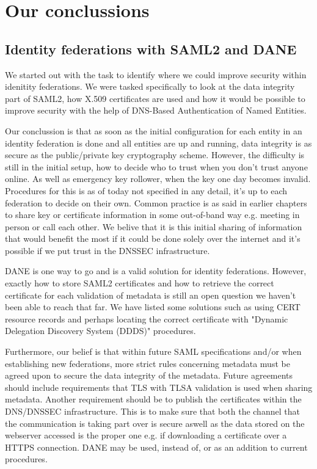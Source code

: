 \section{Our conclussions}
\subsection{Identity federations with SAML2 and DANE}
We started out with the task to identify where we could improve security within idenitity federations.
We were tasked specifically to look at the data integrity part of SAML2, how X.509 certificates are used and how it would be possible to improve security with the help of DNS-Based Authentication of Named Entities.

Our conclussion is that as soon as the initial configuration for each entity in an identity federation is done and all 
entities are up and running, data integrity is as secure as the public/private key cryptography scheme.
However, the difficulty is still in the initial setup, how to decide who to trust when you don't trust anyone online. 
As well as emergency key rollower, when the key one day becomes invalid. 
Procedures for this is as of today not specified in any detail, it's up to each federation to decide on their own.
Common practice is as said in earlier chapters to share key or certificate information in some out-of-band way e.g. meeting in person or call each other.
We belive that it is this initial sharing of information that would benefit the most if it could be done solely over the internet and it's possible if we put trust in the DNSSEC infrastructure.

DANE is one way to go and is a valid solution for identity federations.
However, exactly how to store SAML2 certificates and how to retrieve the correct certificate for each validation of metadata is still an open question we haven't been able to reach that far.
We have listed some solutions such as using CERT resource records and perhaps locating the correct certificate with "Dynamic Delegation Discovery System (DDDS)" procedures.

Furthermore, our belief is that within future SAML specifications and/or when establishing new federations, more strict rules concerning metadata must be agreed upon to secure the data integrity of the metadata.
Future agreements should include requirements that TLS with TLSA validation is used when sharing metadata.
Another requirement should be to publish the certificates within the DNS/DNSSEC infrastructure.
This is to make sure that both the channel that the communication is taking part over is secure aswell as the data stored on the webserver accessed is the proper one e.g. if downloading a certificate over a HTTPS connection.
DANE may be used, instead of, or as an addition to current procedures.

